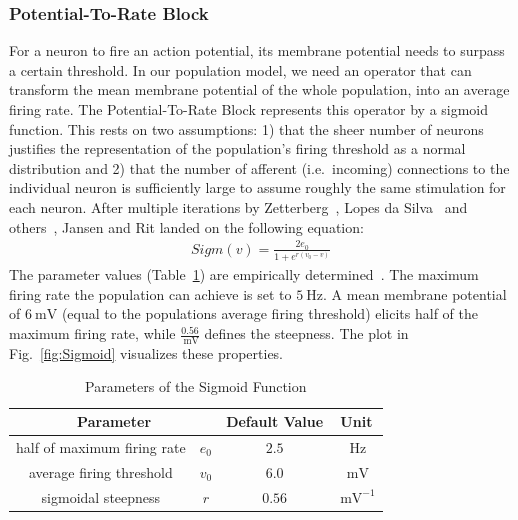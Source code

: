\subsubsection{Potential-To-Rate Block}
For a neuron to fire an action potential, its membrane potential needs to surpass a certain threshold.
In our population model, we need an operator that can transform
the mean membrane potential of the whole population, into an average firing rate.
The Potential-To-Rate Block represents this operator by a sigmoid function.
This rests on two assumptions:
1) that the sheer number of neurons justifies the representation of the population's
firing threshold as a normal distribution and
2) that the number of afferent (i.e.\ incoming) connections to the individual neuron is sufficiently large
to assume roughly the same stimulation for each neuron.
After multiple iterations by Zetterberg~\cite{zetterberg_performance_1978},
Lopes da Silva~\cite{lopes_da_silva_models_1976} and others~\cite{van_rotterdam_model_1982},
Jansen and Rit landed on the following equation:
\begin{align}
    Sigm(v) = \frac{2e_0}{1+e^{r(v_0-v)}} \label{eq:SigmJansenRit}
\end{align}
The parameter values (Table~\ref{tab:sigmoid_params}) are empirically
determined~\parencite{jansen_neurophysiologically-based_1993}.
The maximum firing rate the population can achieve is set to $\SI{5}{\hertz}$.
A mean membrane potential of $\SI{6}{\milli\volt}$ (equal to the populations average firing threshold) elicits half
of the maximum firing rate, while $\frac{0.56}{\SI{}{\milli\volt}}$ defines the steepness.
The plot in Fig.~\ref{fig:Sigmoid} visualizes these properties.
\begin{table}[H]
    \centering
    \begin{tabular}{ |c|c|c|c| }
        \hline
        \multicolumn{2}{|c|}{Parameter} & Default Value & Unit \\
        \hline
        \hline
        half of maximum firing rate & \(e_0\) & \(2.5\)  & \(\SI{}{\hertz}\)      \\
        \hline
        average firing threshold    & \(v_0\) & \(6.0\)  & \(\SI{}{\milli\volt}\)      \\
        \hline
        sigmoidal steepness         & \(r\)   & \(0.56\) & \(\SI{}{\milli\volt}^{-1}\) \\
        \hline
    \end{tabular}
    \caption{Parameters of the Sigmoid Function}
    \label{tab:sigmoid_params}
\end{table}


